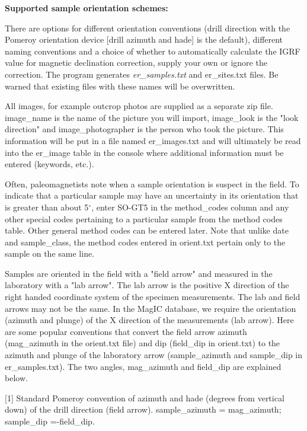 \documentclass[11pt]{book}
\begin{document}
{  
{\bf Supported sample orientation schemes:}

  There are options for 
 different orientation conventions (drill direction with the Pomeroy orientation device  [drill azimuth and hade] is the default), different naming conventions and a choice of whether to automatically calculate the IGRF value for magnetic declination correction, supply your own or ignore the correction.  The program generates {\it er\_samples.txt} and {er\_sites.txt} files.  Be warned that existing files with these names will be overwritten.   
 
 All images, for example outcrop photos are supplied as a separate zip file. image\_name is the name of the picture you will import, image\_look is the "look direction" and image\_photographer is the person who took the picture. This information will be put in a file named er\_images.txt and will ultimately be read into the er\_image table in the console where additional information must be entered (keywords, etc.).

Often, paleomagnetists note when a sample orientation is suspect in the field. To indicate that a particular sample may have an uncertainty in its orientation that is greater than about 5$^{\circ}$, enter SO-GT5 in the method\_codes column and any other special codes pertaining to a particular sample from the method codes table. Other general method codes can be entered later. Note that unlike date and sample\_class, the method codes entered in orient.txt pertain only to the sample on the same line.




Samples are oriented in the field with a "field arrow" and measured in the laboratory with a "lab arrow". The lab arrow is the positive X direction of the right handed coordinate system of the specimen measurements. The lab and field arrows may not be the same. In the MagIC database, we require the orientation (azimuth and plunge) of the X direction of the measurements (lab arrow). Here are some popular conventions that convert the field arrow azimuth (mag\_azimuth in the orient.txt file) and dip (field\_dip in orient.txt) to the azimuth and plunge of the laboratory arrow (sample\_azimuth and sample\_dip in er\_samples.txt). The two angles, mag\_azimuth and field\_dip are explained below.

{\parindent 0pt
[1] Standard Pomeroy convention of azimuth and hade (degrees from vertical down) of the drill direction (field arrow). sample\_azimuth = mag\_azimuth; sample\_dip =-field\_dip.

}}
\end{document}

